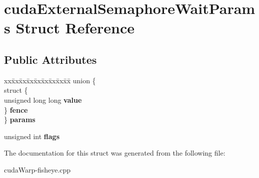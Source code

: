 \hypertarget{structcudaExternalSemaphoreWaitParams}{}\section{cuda\+External\+Semaphore\+Wait\+Params Struct Reference}
\label{structcudaExternalSemaphoreWaitParams}
\subsection*{Public Attributes}
\begin{DoxyCompactItemize}
\item 
\begin{tabbing}
xx\=xx\=xx\=xx\=xx\=xx\=xx\=xx\=xx\=\kill
union \{\\
\>struct \{\\
\>\>unsigned long long {\bfseries value}\\
\>\} {\bfseries fence}\\
\} {\bfseries params}\hypertarget{structcudaExternalSemaphoreWaitParams_a7e7991382c395dd5f7d273373b3bad5e}{}\label{structcudaExternalSemaphoreWaitParams_a7e7991382c395dd5f7d273373b3bad5e}
\\

\end{tabbing}\item 
unsigned int {\bfseries flags}\hypertarget{structcudaExternalSemaphoreWaitParams_a52dfb6a3f213507e3efb1a6b8d06140a}{}\label{structcudaExternalSemaphoreWaitParams_a52dfb6a3f213507e3efb1a6b8d06140a}

\end{DoxyCompactItemize}


The documentation for this struct was generated from the following file\+:\begin{DoxyCompactItemize}
\item 
cuda\+Warp-\/fisheye.\+cpp\end{DoxyCompactItemize}
